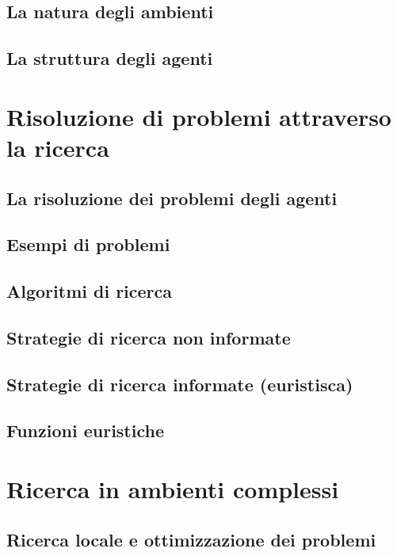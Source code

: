 \documentclass[a4paper]{extarticle}
\begin{document}
\subsection{La natura degli ambienti}

\subsection{La struttura degli agenti}

\newpage

\section{Risoluzione di problemi attraverso la ricerca}

\subsection{La risoluzione dei problemi degli agenti}

\subsection{Esempi di problemi}

\subsection{Algoritmi di ricerca}

\subsection{Strategie di ricerca non informate}

\subsection{Strategie di ricerca informate (euristisca)}

\subsection{Funzioni euristiche}

\newpage

\section{Ricerca in ambienti complessi}

\subsection{Ricerca locale e ottimizzazione dei problemi}
\end{document}
